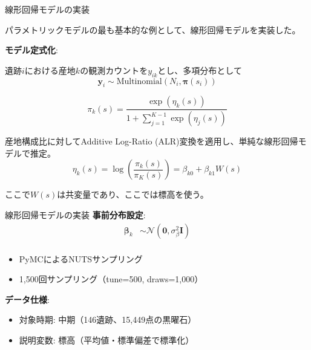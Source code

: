 \documentclass[xelatex, 8pt]{beamer}
\theoremstyle{plain}
\theoremstyle{definition}
\begin{document}
\begin{frame}{線形回帰モデルの実装}

    パラメトリックモデルの最も基本的な例として、線形回帰モデルを実装した。

    \vspace{3mm}
    \textbf{モデル定式化}:

    遺跡$i$における産地$k$の観測カウントを$y_{ik}$とし、多項分布として
    $$\mathbf{y}_i \sim \text{Multinomial}(N_i, \boldsymbol{\pi}(s_i))$$

    $$\pi_k(s) = \frac{\exp(\eta_k(s))}{1 + \sum_{j=1}^{K-1} \exp(\eta_j(s))}$$

    産地構成比に対してAdditive Log-Ratio (ALR)変換を適用し、単純な線形回帰モデルで推定。
    $$\eta_k(s) = \log\left(\frac{\pi_k(s)}{\pi_K(s)}\right) = \beta_{k0} + \beta_{k1} W(s) $$

    ここで$W(s)$は共変量であり、ここでは標高を使う。
\end{frame}

\begin{frame}{線形回帰モデルの実装}
    \textbf{事前分布設定}:
    \begin{align}
        \boldsymbol{\beta}_k &\sim \mathcal{N}(\mathbf{0}, \sigma_{\beta}^2 \mathbf{I})\\
    \end{align}

    \begin{itemize}
        \item PyMCによるNUTSサンプリング
        \item 1,500回サンプリング（tune=500, draws=1,000）
    \end{itemize}

    \vspace{3mm}

    \textbf{データ仕様}:
    \begin{itemize}
        \item 対象時期: 中期（146遺跡、15,449点の黒曜石）
        \item 説明変数: 標高（平均値・標準偏差で標準化）
    \end{itemize}
\end{frame}
\end{document}
